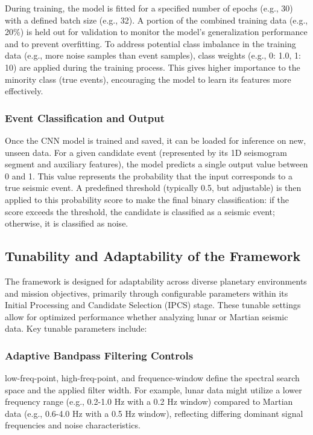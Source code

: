 \documentclass[conference]{IEEEtran}
\begin{document}
        During training, the model is fitted for a specified number of epochs (e.g., 30) with a defined batch size
            (e.g., 32). A portion of the combined training data (e.g., 20\%) is held out for validation to monitor the
            model's generalization performance and to prevent overfitting. To address potential class imbalance in the
            training data (e.g., more noise samples than event samples), class weights (e.g., {0: 1.0, 1: 10}) are applied
            during the training process. This gives higher importance to the minority class (true events), encouraging the
            model to learn its features more effectively.
        
        \subsubsection{Event Classification and Output}
            Once the CNN model is trained and saved, it can be loaded for inference on new, unseen data. For a given
            candidate event (represented by its 1D seismogram segment and auxiliary features), the model predicts a
            single output value between 0 and 1. This value represents the probability that the input corresponds to a
            true seismic event. A predefined threshold (typically 0.5, but adjustable) is then applied to this
            probability score to make the final binary classification: if the score exceeds the threshold, the candidate
            is classified as a seismic event; otherwise, it is classified as noise.
        
        \subsection{Tunability and Adaptability of the Framework}
            The framework is designed for adaptability across diverse planetary environments and mission objectives,
            primarily through configurable parameters within its Initial Processing and Candidate Selection (IPCS)
            stage. These tunable settings allow for optimized performance whether analyzing lunar or Martian seismic
            data.
            Key tunable parameters include:
            \subsubsection{Adaptive Bandpass Filtering Controls}
                low-freq-point, high-freq-point, and frequence-window define the spectral search space and the applied
                filter width. For example, lunar data might utilize a lower frequency range (e.g., 0.2-1.0 Hz with a 0.2 Hz
                window) compared to Martian data (e.g., 0.6-4.0 Hz with a 0.5 Hz window), reflecting differing dominant
                signal frequencies and noise characteristics.
\end{document}
